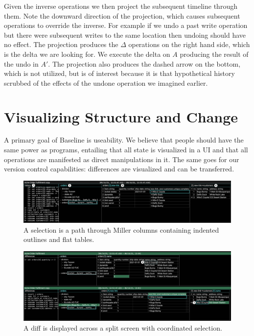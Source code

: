\documentclass[english,submission]{programming}
\theoremstyle{definition}
\begin{document}
Given the inverse operations we then project the subsequent timeline through them. Note the downward direction of the projection, which causes subsequent operations to override the inverse. For example if we undo a past \textsf{write} operation but there were subsequent writes to the same location then undoing should have no effect. The projection produces the $\Delta$ operations on the right hand side, which is the delta we are looking for. We execute the delta on $A$ producing the result of the undo in $A'$. The projection also produces the dashed arrow on the bottom, which is not utilized, but is of interest because it is that hypothetical history scrubbed of the effects of the undone operation we imagined earlier.




\section{Visualizing Structure and Change}\label{UI}

A primary goal of Baseline is useability. We believe that people should have the same power as programs, entailing that all state is visualized in a UI and that all operations are manifested as direct manipulations in it. The same goes for our version control capabilities: differences are visualized and can be transferred.

\begin{figure}
\includegraphics[width=\textwidth]{GUInumbered.png}
\caption{A selection is a path through Miller columns containing indented outlines and flat tables.}
\label{fig:UI}
\end{figure}

\begin{figure}
\includegraphics[width=\textwidth]{DiffNumbered.png}
\caption{A diff is displayed across a split screen with coordinated selection.}
\label{fig:Diff}
\end{figure}
\end{document}
